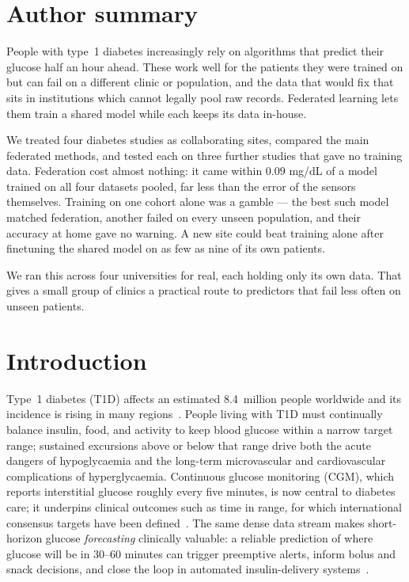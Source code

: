 \documentclass[10pt,letterpaper]{article}
\begin{document}
\section*{Author summary}
People with type~1 diabetes increasingly rely on algorithms that predict their
glucose half an hour ahead. These work well for the patients they were trained
on but can fail on a different clinic or population, and the data that would
fix that sits in institutions which cannot legally pool raw records. Federated
learning lets them train a shared model while each keeps its data in-house.

We treated four diabetes studies as collaborating sites, compared the main
federated methods, and tested each on three further studies that gave no
training data. Federation cost almost nothing: it came within $0.09$ mg/dL of a
model trained on all four datasets pooled, far less than the error of the
sensors themselves. Training on one cohort alone was a gamble --- the best such
model matched federation, another failed on every unseen population, and their
accuracy at home gave no warning. A new site could beat training alone after
finetuning the shared model on as few as nine of its own patients.

We ran this across four universities for real, each holding only its own data.
That gives a small group of clinics a practical route to predictors that fail
less often on unseen patients.

\clearpage
{}
\linenumbers

\section*{Introduction}

Type~1 diabetes (T1D) affects an estimated 8.4~million people worldwide and its
incidence is rising in many regions~\cite{idf2021,gregory2022t1dindex}. People living with T1D must
continually balance insulin, food, and activity to keep blood glucose within a
narrow target range; sustained excursions above or below that range drive both
the acute dangers of hypoglycaemia and the long-term microvascular and
cardiovascular complications of hyperglycaemia. Continuous glucose monitoring
(CGM), which reports interstitial glucose roughly every five minutes, is now
central to diabetes care; it underpins clinical outcomes such as time in range,
for which international consensus targets have been defined~\cite{battelino2019tir}. The same dense data stream makes
short-horizon glucose \emph{forecasting} clinically valuable: a reliable
prediction of where glucose will be in 30--60 minutes can trigger preemptive
alerts, inform bolus and snack decisions, and close the loop in automated
insulin-delivery systems~\cite{vettoretti2020advanced,bekiari2018ap}.
\end{document}
